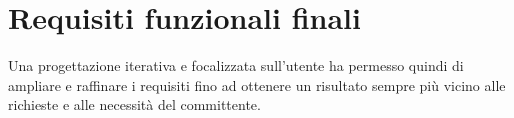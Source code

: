 % 
% 
% 

\section{Requisiti funzionali finali}

Una progettazione iterativa e focalizzata sull'utente ha permesso quindi di ampliare e raffinare i requisiti fino ad ottenere  un risultato sempre più vicino alle richieste e alle necessità del committente.  

